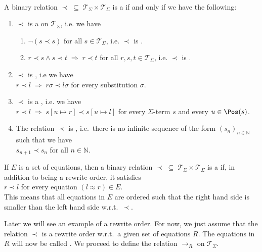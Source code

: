 \begin{Definition} \hspace*{\fill} \\
  A binary relation $\prec \;\subseteq\; \mathcal{T}_\Sigma \times \mathcal{T}_\Sigma$ is a
   if and only if we have the following:
  \begin{enumerate}
  \item $\prec$ is a  on $\mathcal{T}_\Sigma$, i.e. we have
        \begin{enumerate}
        \item $\neg (s \prec s)$ \hspace*{2.6cm} for all $s \in \mathcal{T}_\Sigma$, i.e. $\prec$ is .
        \item $r \prec s \wedge s \prec t \;\Rightarrow\; r \prec t$ \quad for all $r,s,t \in \mathcal{T}_\Sigma$,
              i.e. $\prec$ is . 
        \end{enumerate}
    
  \item $\prec$ is , i.e we have
        \\[0.2cm]
        \hspace*{1.3cm}
        $r \prec l \;\Rightarrow\; r\sigma \prec l\sigma$ \quad for every substitution $\sigma$.
  \item $\prec$ is a , i.e. we have
        \\[0.2cm]
        \hspace*{1.3cm}
        $r \prec l \;\Rightarrow\; s[u \mapsto r] \prec s[u \mapsto l]$ for every $\Sigma$-term $s$ and every
        $u \in\Pos(s)  $.
  \item The relation $\prec$ is , i.e.~there is no infinite sequence of the form
        $(s_n)_{n\in\mathbb{N}}$ such that we have
        \\[0.2cm]
        \hspace*{1.3cm}
        $s_{n+1} \prec s_n$ \quad for all $n \in \mathbb{N}$. 
  \end{enumerate}
  If $E$ is a set of equations, then a binary relation $\prec \;\subseteq\; \mathcal{T}_\Sigma \times \mathcal{T}_\Sigma$
  is a  if, in addition to being a rewrite order, it satisfies
  \\[0.2cm]
  \hspace*{1.3cm}
  $r \prec l$ \quad for every equation $(l \approx r) \in E$.
  \\[0.2cm]    
  This means that all equations in $E$ are ordered such that the right hand side is smaller than the left
  hand side w.r.t.~$\prec$.    \eod
\end{Definition}
Later we will see an example of a rewrite order.  For now, we just assume that 
the relation $\prec$ is a rewrite order w.r.t.~a given set of equations $R$.  The equations in $R$ will now be called
.  We proceed to define the relation $\rightarrow_R$ on $\mathcal{T}_\Sigma$.

